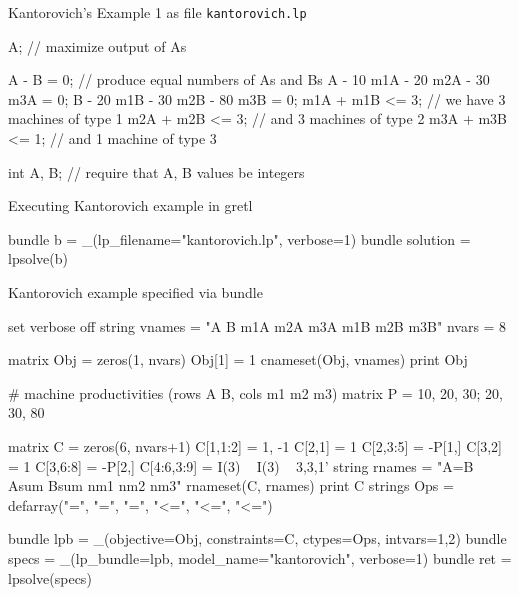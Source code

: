 \documentclass{article}
\begin{document}
\begin{script}[htbp]
  \caption{Kantorovich's Example 1 as file \texttt{kantorovich.lp}}
  \label{ls:kantor-lp}
\begin{scode}
A; // maximize output of As

A - B = 0; // produce equal numbers of As and Bs
A - 10 m1A - 20 m2A - 30 m3A = 0;
B - 20 m1B - 30 m2B - 80 m3B = 0;
m1A + m1B <= 3; // we have 3 machines of type 1
m2A + m2B <= 3; // and 3 machines of type 2
m3A + m3B <= 1; // and 1 machine of type 3

int A, B; // require that A, B values be integers
\end{scode}
\end{script}

\begin{script}[htbp]
  \caption{Executing Kantorovich example in gretl}
  \label{ls:kantor-inp}
\begin{scode}
bundle b = _(lp_filename="kantorovich.lp", verbose=1)
bundle solution = lpsolve(b)
\end{scode}
\end{script}

\begin{script}[htbp]
  \caption{Kantorovich example specified via bundle}
  \label{ls:kantor-bundle}
\begin{scode}
set verbose off
string vnames = "A B m1A m2A m3A m1B m2B m3B"
nvars = 8

matrix Obj = zeros(1, nvars)
Obj[1] = 1
cnameset(Obj, vnames)
print Obj

# machine productivities (rows A B, cols m1 m2 m3)
matrix P = {10, 20, 30; 20, 30, 80}

matrix C = zeros(6, nvars+1)
C[1,1:2] = {1, -1}
C[2,1] = 1
C[2,3:5] = -P[1,]
C[3,2] = 1
C[3,6:8] = -P[2,]
C[4:6,3:9] = I(3) ~ I(3) ~ {3,3,1}'
string rnames = "A=B Asum Bsum nm1 nm2 nm3"
rnameset(C, rnames)
print C
strings Ops = defarray("=", "=", "=", "<=", "<=", "<=")

bundle lpb = _(objective=Obj, constraints=C, ctypes=Ops, intvars={1,2})
bundle specs = _(lp_bundle=lpb, model_name="kantorovich", verbose=1)
bundle ret = lpsolve(specs)
\end{scode}
\end{script}



\end{document}
